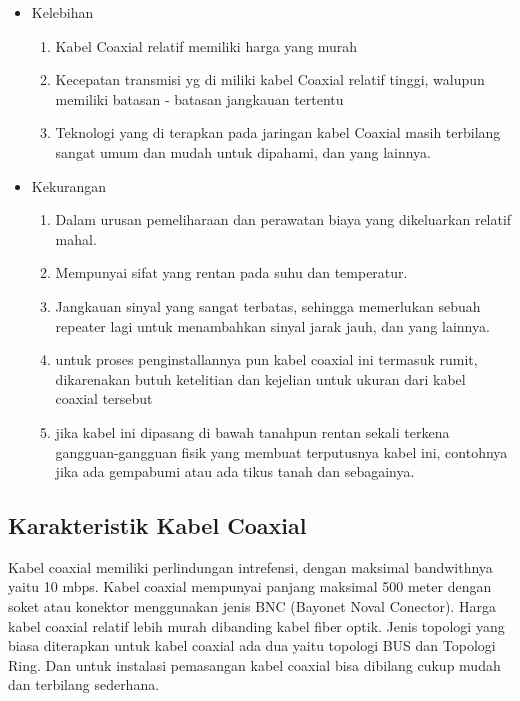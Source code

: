 		\begin{itemize}
			\item Kelebihan
				\begin{enumerate}
					\item Kabel Coaxial relatif memiliki harga yang murah
					\item Kecepatan transmisi yg di miliki kabel Coaxial relatif tinggi, walupun memiliki batasan - batasan jangkauan tertentu
					\item Teknologi yang di terapkan pada jaringan kabel Coaxial masih terbilang sangat umum dan mudah untuk dipahami, dan yang lainnya.
				\end{enumerate}
			\item Kekurangan
				\begin{enumerate}
					\item Dalam urusan pemeliharaan dan perawatan biaya yang dikeluarkan relatif mahal.
					\item Mempunyai sifat yang rentan pada suhu dan temperatur.
					\item Jangkauan sinyal yang sangat terbatas, sehingga memerlukan sebuah repeater lagi untuk menambahkan sinyal jarak jauh, dan yang lainnya.
					\item untuk proses penginstallannya pun kabel coaxial ini termasuk rumit, dikarenakan butuh ketelitian dan kejelian untuk ukuran dari kabel coaxial tersebut
					\item jika kabel ini dipasang di bawah tanahpun rentan sekali terkena gangguan-gangguan fisik yang membuat terputusnya kabel ini, contohnya jika ada gempabumi atau ada tikus tanah dan sebagainya.
				\end{enumerate}
		\end{itemize}
	\subsection {Karakteristik Kabel Coaxial}
	Kabel coaxial memiliki perlindungan intrefensi, dengan maksimal bandwithnya yaitu 10 mbps. Kabel coaxial mempunyai panjang maksimal 500 meter dengan soket atau konektor menggunakan jenis BNC (Bayonet Noval Conector). Harga kabel coaxial relatif lebih murah dibanding kabel fiber optik. Jenis topologi yang biasa diterapkan untuk kabel coaxial ada dua yaitu topologi BUS dan Topologi Ring. Dan untuk instalasi pemasangan kabel coaxial bisa dibilang cukup mudah dan terbilang sederhana.
	
